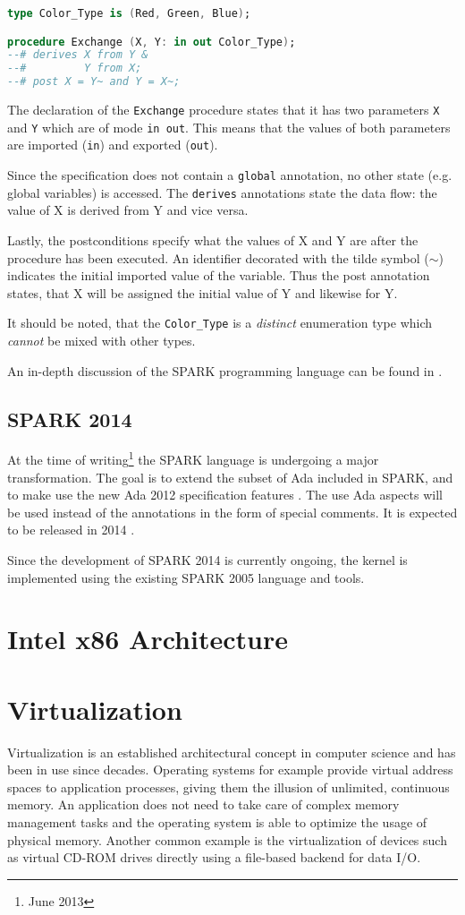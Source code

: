 \begin{lstlisting}[language=Ada]
type Color_Type is (Red, Green, Blue);

procedure Exchange (X, Y: in out Color_Type);
--# derives X from Y &
--#         Y from X;
--# post X = Y~ and Y = X~;
\end{lstlisting}

The declaration of the \texttt{Exchange} procedure states that it has two
parameters \texttt{X} and \texttt{Y} which are of mode \texttt{in out}. This
means that the values of both parameters are imported (\texttt{in}) and exported
(\texttt{out}).

Since the specification does not contain a \texttt{global} annotation, no other
state (e.g. global variables) is accessed. The \texttt{derives} annotations
state the data flow: the value of X is derived from Y and vice versa.

Lastly, the postconditions specify what the values of X and Y are after the
procedure has been executed. An identifier decorated with the tilde symbol
($\sim$) indicates the initial imported value of the variable. Thus the post
annotation states, that X will be assigned the initial value of Y and likewise
for Y.

It should be noted, that the \texttt{Color\_Type} is a \emph{distinct}
enumeration type which \emph{cannot} be mixed with other types.

An in-depth discussion of the SPARK programming language can be found in
\cite{BarnesSPARK}.

\subsection{SPARK 2014}
At the time of writing\footnote{June 2013} the SPARK language is undergoing a
major transformation. The goal is to extend the subset of Ada included in SPARK,
and to make use the new Ada 2012 specification features \cite{Ada2012}. The use
Ada aspects will be used instead of the annotations in the form of special
comments. It is expected to be released in 2014 \cite{SPARK2014:Announcement}.

Since the development of SPARK 2014 is currently ongoing, the kernel is
implemented using the existing SPARK 2005 language and tools.

\section{Intel x86 Architecture}
\section{Virtualization}
Virtualization is an established architectural concept in computer science and
has been in use since decades. Operating systems for example provide virtual
address spaces to application processes, giving them the illusion of unlimited,
continuous memory. An application does not need to take care of complex memory
management tasks and the operating system is able to optimize the usage of
physical memory. Another common example is the virtualization of devices such as
virtual CD-ROM drives directly using a file-based backend for data I/O.

